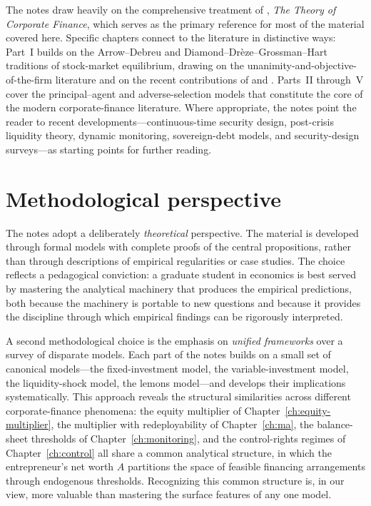 \documentclass[11pt,a4paper,oneside]{book}
\theoremstyle{plain}
\theoremstyle{definition}
\theoremstyle{remark}
\numberwithin{equation}{chapter}
\begin{document}
The notes draw heavily on the comprehensive treatment of \citet{Tirole2006}, \emph{The Theory of Corporate Finance}, which serves as the primary reference for most of the material covered here.
Specific chapters connect to the literature in distinctive ways: Part~I builds on the Arrow--Debreu and Diamond--Drèze--Grossman--Hart traditions of stock-market equilibrium, drawing on the unanimity-and-objective-of-the-firm literature and on the recent contributions of \citet{BisinGottardiRuta2015} and \citet{BisinClementiGottardi2025}.
Parts~II through~V cover the principal--agent and adverse-selection models that constitute the core of the modern corporate-finance literature.
Where appropriate, the notes point the reader to recent developments---continuous-time security design, post-crisis liquidity theory, dynamic monitoring, sovereign-debt models, and security-design surveys---as starting points for further reading.

\section*{Methodological perspective}

The notes adopt a deliberately \emph{theoretical} perspective.
The material is developed through formal models with complete proofs of the central propositions, rather than through descriptions of empirical regularities or case studies.
The choice reflects a pedagogical conviction: a graduate student in economics is best served by mastering the analytical machinery that produces the empirical predictions, both because the machinery is portable to new questions and because it provides the discipline through which empirical findings can be rigorously interpreted.

A second methodological choice is the emphasis on \emph{unified frameworks} over a survey of disparate models.
Each part of the notes builds on a small set of canonical models---the fixed-investment model, the variable-investment model, the liquidity-shock model, the lemons model---and develops their implications systematically.
This approach reveals the structural similarities across different corporate-finance phenomena: the equity multiplier of Chapter~\ref{ch:equity-multiplier}, the multiplier with redeployability of Chapter~\ref{ch:ma}, the balance-sheet thresholds of Chapter~\ref{ch:monitoring}, and the control-rights regimes of Chapter~\ref{ch:control} all share a common analytical structure, in which the entrepreneur's net worth $A$ partitions the space of feasible financing arrangements through endogenous thresholds.
Recognizing this common structure is, in our view, more valuable than mastering the surface features of any one model.
\end{document}
